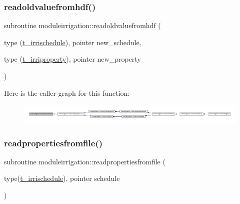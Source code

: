 \subsubsection{\texorpdfstring{readoldvaluefromhdf()}{readoldvaluefromhdf()}}
{\footnotesize\ttfamily subroutine moduleirrigation\+::readoldvaluefromhdf (\begin{DoxyParamCaption}\item[{type (\mbox{\hyperlink{structmoduleirrigation_1_1t__irrischedule}{t\+\_\+irrischedule}}), pointer}]{new\+\_\+schedule,  }\item[{type (\mbox{\hyperlink{structmoduleirrigation_1_1t__irriproperty}{t\+\_\+irriproperty}}), pointer}]{new\+\_\+property }\end{DoxyParamCaption})\hspace{0.3cm}{\ttfamily [private]}}

Here is the caller graph for this function\+:\nopagebreak
\begin{figure}[H]
\begin{center}
\leavevmode
\includegraphics[width=350pt]{namespacemoduleirrigation_a27adbd031b4482b018dcd962be92a681_icgraph}
\end{center}
\end{figure}
\mbox{\label{namespacemoduleirrigation_ad1b1ec0e0230931e65e80ed64cb0fa86}} 
\subsubsection{\texorpdfstring{readpropertiesfromfile()}{readpropertiesfromfile()}}
{\footnotesize\ttfamily subroutine moduleirrigation\+::readpropertiesfromfile (\begin{DoxyParamCaption}\item[{type(\mbox{\hyperlink{structmoduleirrigation_1_1t__irrischedule}{t\+\_\+irrischedule}}), pointer}]{schedule }\end{DoxyParamCaption})\hspace{0.3cm}{\ttfamily [private]}}


